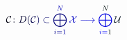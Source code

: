 \documentclass[12pt]{article}
\begin{document}
\makeatletter
\renewcommand*{\@textcolor}[3]{%
  \protect\leavevmode
  \begingroup
    \color#1{#2}#3%
  \endgroup
}
\makeatother
\begin{displaymath}
\mathcal { \mathcolor[RGB]{0,0,15}{C} } \mathcolor[RGB]{0,0,30}{\colon} \mathcolor[RGB]{0,0,45}{D} \mathcolor[RGB]{0,0,60}{(} \mathcal { \mathcolor[RGB]{0,0,75}{C} } \mathcolor[RGB]{0,0,90}{)} \mathcolor[RGB]{0,0,105}{\subset} \mathcolor[RGB]{0,0,120}{\bigoplus} _ { \mathcolor[RGB]{0,0,135}{i} \mathcolor[RGB]{0,0,150}{=} \mathcolor[RGB]{0,0,165}{1} } ^ { \mathcolor[RGB]{0,0,180}{N} } \mathcal { \mathcolor[RGB]{0,0,195}{X} } \mathcolor[RGB]{0,0,210}{\longrightarrow} \mathcolor[RGB]{0,0,225}{\bigoplus} _ { \mathcolor[RGB]{0,0,240}{i} \mathcolor[RGB]{0,0,255}{=} \mathcolor[RGB]{0,15,0}{1} } ^ { \mathcolor[RGB]{0,15,15}{N} } \mathcal { \mathcolor[RGB]{0,15,30}{U} }
\end{displaymath}
\end{document}
